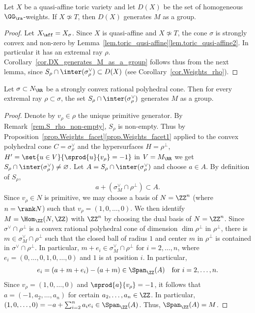 \begin{corollary}
\label{cor.DX_generates_M_as_a_group}
Let $X$ be a quasi-affine toric variety and let $D(X)$ be the set of
homogeneous $\GG_\ra$-weights. If
$X \not \simeq T$, then $D(X)$ generates $M$ as a group.
\end{corollary}

\begin{proof}
Let $X_{\aff} = X_{\sigma}$.
Since $X$ is quasi-affine and $X \not\simeq T$, the cone $\sigma$ is strongly convex and
non-zero by Lemma~\ref{lem.toric_qusi-affine}\eqref{lem.toric_qusi-affine2}.
In particular it has an extremal ray $\rho$.
Corollary~\ref{cor.DX_generates_M_as_a_group} follows thus from the next lemma, since
$S_\rho \cap \inter(\sigma_{\rho}^\vee) \subset D(X)$ (see Corollary~\ref{cor.Weights_rho}).
\end{proof}

\begin{lemma}
Let $\sigma \subset N_{\RR}$ be a strongly convex rational polyhedral cone. Then for every
extremal ray $\rho \subset \sigma$, the set $S_{\rho} \cap \inter(\sigma_{\rho}^\vee)$ generates $M$ as a group.
\end{lemma}

\begin{proof}
Denote by $v_\rho \in \rho$ the unique primitive generator.
By Remark~\ref{rem.S_rho_non-empty}, $S_\rho$ is non-empty.
Thus by Proposition~\ref{prop.Weights_facet}\eqref{prop.Weights_facet1}
applied to the convex polyhedral cone $C = \sigma_{\rho}^\vee$
and the hypersurfaces $H = \rho^\bot$, $H' = \set{u \in V}{\sprod{u}{v_{\rho}}=-1}$ in $V = M_{\RR}$
we get $S_{\rho} \cap \inter(\sigma_{\rho}^\vee) \neq \varnothing$.
Let $A = S_{\rho} \cap \inter(\sigma_{\rho}^\vee)$ and choose $a \in A$.
By definition of $S_{\rho}$,
\[
a + (\sigma_M^\vee \cap \rho^\bot) \subset A.
\]
Since $v_{\rho} \in N$ is primitive,
we may choose a basis of $N = \ZZ^n$ (where $n = \rank N$) such
that $v_{\rho} = (1, 0, \ldots, 0)$. We then identify $M = \Hom_{\ZZ}(N, \ZZ)$
with $\ZZ^n$ by choosing the dual basis of $N = \ZZ^n$.
Since $\sigma^\vee \cap \rho^\bot$ is a convex rational polyhedral cone of dimension
$\dim \rho^\bot$ in $\rho^\bot$, there is $m \in \sigma_M^\vee \cap \rho^\bot$ such that
the closed ball of radius $1$ and center $m$ in $\rho^\bot$ is contained in
$\sigma^\vee \cap \rho^\bot$. In particular, $m + e_i \in \sigma_M^\vee \cap \rho^\bot$
for $i =2, \ldots, n$, where $e_i = (0, \ldots, 0, 1, 0, \ldots, 0)$ and $1$ is at position $i$.
In particular,
\[
e_i = (a + m + e_i) - (a+m) \in \Span_{\ZZ}(A) \quad \textrm{for $i=2, \ldots, n$}.
\]
Since $v_\rho = (1, 0, \ldots, 0)$ and $\sprod{a}{v_{\rho}} = -1$, it follows that
$a = (-1, a_2, \ldots, a_n)$ for certain $a_2, \ldots, a_n \in \ZZ$.
In particular, $(1, 0, \ldots, 0) = -a + \sum_{i=2}^n a_i e_i \in \Span_{\ZZ}(A)$.
Thus, $\Span_{\ZZ}(A) = M$.
\end{proof}

